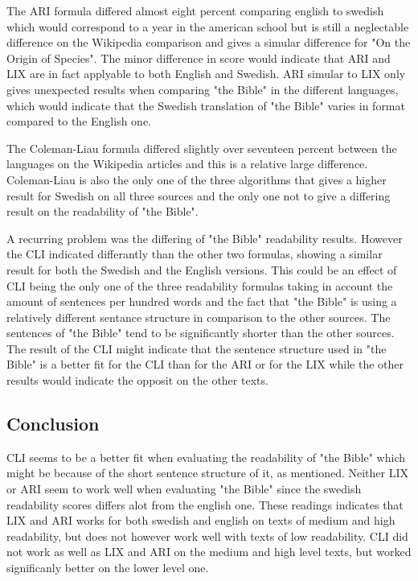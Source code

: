 \documentclass[a4paper]{article}
\begin{document}
The ARI formula differed almost eight percent comparing english to swedish which would correspond to a year in the american school but is still a neglectable difference on the Wikipedia comparison and gives a simular difference for "On the Origin of Species". The minor difference in score would indicate that ARI and LIX are in fact applyable to both English and Swedish. ARI simular to LIX only gives unexpected results when comparing "the Bible" in the different languages, which would indicate that the Swedish translation of "the Bible" varies in format compared to the English one.

The Coleman-Liau formula differed slightly over seventeen percent between the languages on the Wikipedia articles and this is a relative large difference. Coleman-Liau is also the only one of the three algorithms that gives a higher result for Swedish on all three sources and the only one not to give a differing result on the readability of "the Bible".

A recurring problem was the differing of "the Bible" readability results. However the CLI indicated differantly than the other two formulas, showing a similar result for both the Swedish and the English versions. This could be an effect of CLI being the only one of the three readability formulas taking in account the amount of sentences per hundred words and the fact that "the Bible" is using a relatively different sentance structure in comparison to the other sources. The sentences of "the Bible" tend to be significantly shorter than the other sources. The result of the CLI might indicate that the sentence structure used in "the Bible" is a better fit for the CLI than for the ARI or for the LIX while the other results would indicate the opposit on the other texts.

\subsection{Conclusion}
CLI seems to be a better fit when evaluating the readability of "the Bible" which might be because of the short sentence structure of it, as mentioned. Neither LIX or ARI seem to work well when evaluating "the Bible" since the swedish readability scores differs alot from the english one. These readings indicates that LIX and ARI works for both swedish and english on texts of medium and high readability, but does not however work well with texts of low readability. CLI did not work as well as LIX and ARI on the medium and high level texts, but worked significanly better on the lower level one. 
\end{document}
